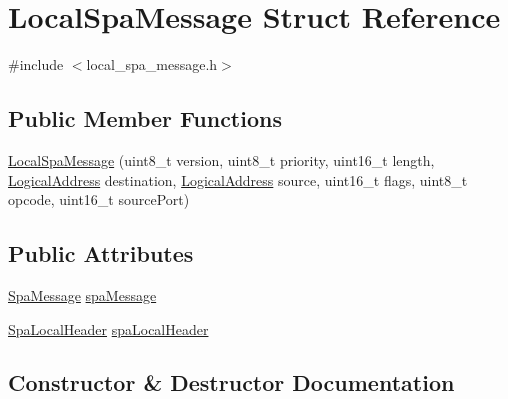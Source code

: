 \hypertarget{structLocalSpaMessage}{}\section{Local\+Spa\+Message Struct Reference}
\label{structLocalSpaMessage}


{\ttfamily \#include $<$local\+\_\+spa\+\_\+message.\+h$>$}

\subsection*{Public Member Functions}
\begin{DoxyCompactItemize}
\item 
\hyperlink{structLocalSpaMessage_a3d0882edfa48a1604ec30784308d65d6}{Local\+Spa\+Message} (uint8\+\_\+t version, uint8\+\_\+t priority, uint16\+\_\+t length, \hyperlink{structLogicalAddress}{Logical\+Address} destination, \hyperlink{structLogicalAddress}{Logical\+Address} source, uint16\+\_\+t flags, uint8\+\_\+t opcode, uint16\+\_\+t source\+Port)
\end{DoxyCompactItemize}
\subsection*{Public Attributes}
\begin{DoxyCompactItemize}
\item 
\hyperlink{structSpaMessage}{Spa\+Message} \hyperlink{structLocalSpaMessage_a87829228c5af1850fc3efc288cfbbdfc}{spa\+Message}
\item 
\hyperlink{structSpaLocalHeader}{Spa\+Local\+Header} \hyperlink{structLocalSpaMessage_af8cc4ca1b9f7d7d993b563e0110e940a}{spa\+Local\+Header}
\end{DoxyCompactItemize}


\subsection{Constructor \& Destructor Documentation}
\mbox{\label{structLocalSpaMessage_a3d0882edfa48a1604ec30784308d65d6}} 
